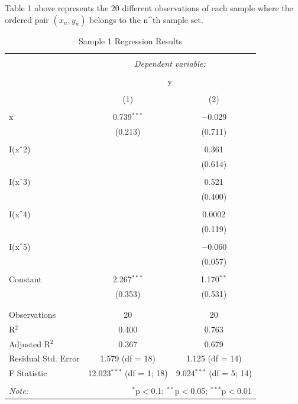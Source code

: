 \documentclass{article}
\begin{document}
Table 1 above represents the 20 different observations of each sample where the ordered pair $(x_{n},y_{n})$ belongs to the n^th sample set.
\newpage
\begin{table}[!htbp] \centering 
  \caption{Sample 1 Regression Results} 
  \label{} 
\begin{tabular}{@{\extracolsep{5pt}}lcc} 
\\[-1.8ex]\hline 
\hline \\[-1.8ex] 
 & \multicolumn{2}{c}{\textit{Dependent variable:}} \\ 
\cline{2-3} 
\\[-1.8ex] & \multicolumn{2}{c}{y} \\ 
\\[-1.8ex] & (1) & (2)\\ 
\hline \\[-1.8ex] 
 x & 0.739$^{***}$ & $-$0.029 \\ 
  & (0.213) & (0.711) \\ 
  & & \\ 
 I(x$\hat{\mkern6mu}$2) &  & 0.361 \\ 
  &  & (0.614) \\ 
  & & \\ 
 I(x$\hat{\mkern6mu}$3) &  & 0.521 \\ 
  &  & (0.400) \\ 
  & & \\ 
 I(x$\hat{\mkern6mu}$4) &  & 0.0002 \\ 
  &  & (0.119) \\ 
  & & \\ 
 I(x$\hat{\mkern6mu}$5) &  & $-$0.060 \\ 
  &  & (0.057) \\ 
  & & \\ 
 Constant & 2.267$^{***}$ & 1.170$^{**}$ \\ 
  & (0.353) & (0.531) \\ 
  & & \\ 
\hline \\[-1.8ex] 
Observations & 20 & 20 \\ 
R$^{2}$ & 0.400 & 0.763 \\ 
Adjusted R$^{2}$ & 0.367 & 0.679 \\ 
Residual Std. Error & 1.579 (df = 18) & 1.125 (df = 14) \\ 
F Statistic & 12.023$^{***}$ (df = 1; 18) & 9.024$^{***}$ (df = 5; 14) \\ 
\hline 
\hline \\[-1.8ex] 
\textit{Note:}  & \multicolumn{2}{r}{$^{*}$p$<$0.1; $^{**}$p$<$0.05; $^{***}$p$<$0.01} \\ 
\end{tabular} 
\end{table} 
\end{document}
